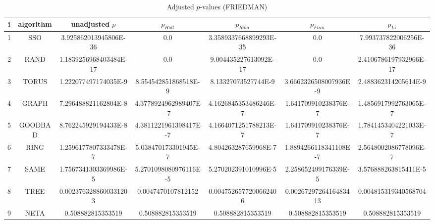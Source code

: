 \documentclass[a4paper,10pt]{article}
\begin{document}
\begin{landscape}
\begin{table}[!htp]
\centering\scriptsize
\caption{Adjusted $p$-values (FRIEDMAN)}
\begin{tabular}{ccccccc}
i&algorithm&unadjusted $p$&$p_{Holl}$&$p_{Rom}$&$p_{Finn}$&$p_{Li}$\\
\hline
1& SSO&3.925862013945806E-36&0.0&3.3589337668899293E-35&0.0&7.993737822006256E-36\\
2& RAND&1.1839256968403484E-17&0.0&9.004435227613092E-17&0.0&2.4106786197932966E-17\\
3& TORUS&1.222077497174035E-9&8.554542851868518E-9&8.13327073527744E-9&3.6662326508007936E-9&2.488362314205614E-9\\
4& GRAPH&7.296488821162804E-8&4.3778924962989407E-7&4.1626845353486246E-7&1.641709910238376E-7&1.4856917992763065E-7\\
5& GOODBAD&8.762245929194433E-8&4.3811221961398417E-7&4.1664071251788213E-7&1.641709910238376E-7&1.7841453404221033E-7\\
6& RING&1.2596177807333478E-7&5.038470173301945E-7&4.804263287659968E-7&1.8894266118341108E-7&2.5648002086778096E-7\\
7& SAME&1.7567341303369986E-5&5.2701098080976116E-5&5.270202391010996E-5&2.258652499176339E-5&3.576888263815411E-5\\
8& TREE&0.0023763288600331203&0.0047470107812152&0.0047526577200662406&0.0026729726416483413&0.004815319340568704\\
9& NETA&0.508882815353519&0.508882815353519&0.508882815353519&0.508882815353519&0.508882815353519\\
\hline
\end{tabular}
\end{table}


\newpage


\end{landscape}
\end{document}
